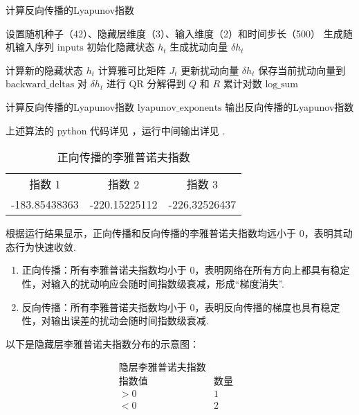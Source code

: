 \begin{algorithm}
   \caption{计算反向传播的Lyapunov指数}
   \begin{algorithmic}[1]
      \STATE 设置随机种子（42）、隐藏层维度（3）、输入维度（2）和时间步长（500）
      \STATE 生成随机输入序列 $\text{inputs}$
      \STATE 初始化隐藏状态 $h_t$
      \STATE 生成扰动向量 $\delta h_t$

            \STATE 计算新的隐藏状态 $h_t$
            \STATE 计算雅可比矩阵 $J_t$
            \STATE 更新扰动向量 $\delta h_t$
            \STATE 保存当前扰动向量到 $\text{backward\_deltas}$
            \STATE 对 $\delta h_t$ 进行 QR 分解得到 $Q$ 和 $R$
            \STATE 累计对数 $\text{log\_sum}$
      \ENDFOR

      \STATE 计算反向传播的Lyapunov指数 $\text{lyapunov\_exponents}$
      \STATE 输出反向传播的Lyapunov指数
   \end{algorithmic}
\end{algorithm}

上述算法的 python 代码详见 \cite{sec:code}，运行中间输出详见 \cite{sec:result}. 

\begin{table}[htbp]
   \caption{正向传播的李雅普诺夫指数}
   \begin{tabular}{ccc}
      指数 1 & 指数 2 & 指数 3 \\
      -183.85438363 & -220.15225112 & -226.32526437
   \end{tabular}
\end{table}

根据运行结果显示，正向传播和反向传播的李雅普诺夫指数均远小于 0，表明其动态行为快速收敛. 

\begin{enumerate}
   \item 正向传播：所有李雅普诺夫指数均小于 0，表明网络在所有方向上都具有稳定性，对输入的扰动响应会随时间指数级衰减，形成“梯度消失”. 
   \item 反向传播：所有李雅普诺夫指数均小于 0，表明反向传播的梯度也具有稳定性，对输出误差的扰动会随时间指数级衰减. 
\end{enumerate}

以下是隐藏层李雅普诺夫指数分布的示意图：

\[
\begin{array}{ccc}
\text{隐层李雅普诺夫指数} & & \\
\hline
\text{指数值} & \text{数量} \\
\hline
>0 & 1 \\
<0 & 2 \\
\end{array}
\]

